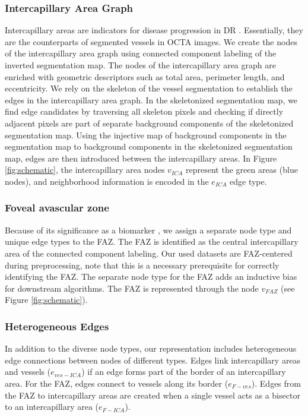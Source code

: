 \subsubsection{Intercapillary Area Graph}
Intercapillary areas are indicators for disease progression in DR \cite{schottenhamml2016automatic, terada2022intercapillary}. Essentially, they are the counterparts of segmented vessels in OCTA images. We create the nodes of the intercapillary area graph using connected component labeling of the inverted segmentation map. The nodes of the intercapillary area graph are enriched with geometric descriptors such as total area, perimeter length, and eccentricity. We rely on the skeleton of the vessel segmentation to establish the edges in the intercapillary area graph. In the skeletonized segmentation map, we find edge candidates by traversing all skeleton pixels and checking if directly adjacent pixels are part of separate background components of the skeletonized segmentation map. Using the injective map of background components in the segmentation map to background components in the skeletonized segmentation map, edges are then introduced between the intercapillary areas. In Figure \ref{fig:schematic}, the intercapillary area nodes $v_{\scriptscriptstyle ICA}$ represent the green areas (blue nodes), and neighborhood information is encoded in the $e_{\scriptscriptstyle ICA}$ edge type.



\subsubsection{Foveal avascular zone} 
Because of its significance as a biomarker \cite{sun2021optical}, we assign a separate node type and unique edge types to the FAZ. The FAZ is identified as the central intercapillary area of the connected component labeling. Our used datasets are FAZ-centered during preprocessing, note that this is a necessary prerequisite for correctly identifying the FAZ. The separate node type for the FAZ adds an inductive bias for downstream algorithms. The FAZ is represented through the node $v_{\scriptscriptstyle FAZ}$ (see Figure \ref{fig:schematic}).

\subsubsection{Heterogeneous Edges}

In addition to the diverse node types, our representation includes heterogeneous edge connections between nodes of different types. Edges link intercapillary areas and vessels ($e_{\scriptscriptstyle ves-ICA}$) if an edge forms part of the border of an intercapillary area. For the FAZ, edges connect to vessels along its border ($e_{\scriptscriptstyle F-ves}$). Edges from the FAZ to intercapillary areas are created when a single vessel acts as a bisector to an intercapillary area ($e_{\scriptscriptstyle F-ICA}$). \\

